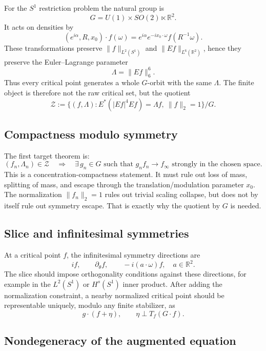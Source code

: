 \documentclass[12pt]{article}
\begin{document}
For the $S^1$ restriction problem the natural group is
\[
  G=U(1)\times SO(2)\ltimes\mathbb R^2.
\]
It acts on densities by
\[
  (e^{i\alpha},R,x_0)\cdot f(\omega)
  =
  e^{i\alpha}e^{-ix_0\cdot\omega}f(R^{-1}\omega).
\]
These transformations preserve $\|f\|_{L^2(S^1)}$ and
$\|Ef\|_{L^6(\mathbb R^2)}$, hence they preserve the Euler--Lagrange parameter
\[
  \Lambda=\|Ef\|_6^6.
\]
Thus every critical point generates a whole $G$-orbit with the same
$\Lambda$. The finite object is therefore not the raw critical set, but the
quotient
\[
  \mathcal Z
  :=
  \{(f,\Lambda):E^*(|Ef|^4Ef)=\Lambda f,\ \|f\|_2=1\}/G.
\]

\subsection{Compactness modulo symmetry}

The first target theorem is:
\[
  (f_n,\Lambda_n)\in\mathcal Z
  \quad\Longrightarrow\quad
  \exists\,g_n\in G
  \text{ such that } g_nf_n\to f_\infty
  \text{ strongly in the chosen space.}
\]
This is a concentration-compactness statement. It must rule out loss of mass,
splitting of mass, and escape through the translation/modulation parameter
$x_0$. The normalization $\|f_n\|_2=1$ rules out trivial scaling collapse, but
does not by itself rule out symmetry escape. That is exactly why the quotient
by $G$ is needed.

\subsection{Slice and infinitesimal symmetries}

At a critical point $f$, the infinitesimal symmetry directions are
\[
  if,\qquad
  \partial_\theta f,\qquad
  -i(a\cdot\omega)f,\quad a\in\mathbb R^2.
\]
The slice should impose orthogonality conditions against these directions, for
example in the $L^2(S^1)$ or $H^s(S^1)$ inner product. After adding the
normalization constraint, a nearby normalized critical point should be
representable uniquely, modulo any finite stabilizer, as
\[
  g\cdot(f+\eta),
  \qquad
  \eta\perp T_f(G\cdot f).
\]

\subsection{Nondegeneracy of the augmented equation}
\end{document}
